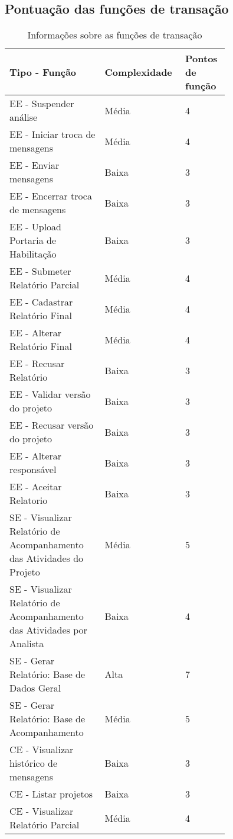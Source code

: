     
\vfill
\pagebreak
  \subsection{Pontuação das funções de transação}
    
	\begin{table*}[!h]
	\centering
	\caption{Informações sobre as funções de transação}
	\label{funcoes_transacao}
	  \begin{tabular}{|p{0.40\linewidth}|p{0.20\linewidth}|p{0.14\linewidth}|}
	\hline
	\textbf{Tipo - Função} & \textbf{Complexidade} & \textbf{Pontos de função} \\
	\hline
	  EE - Suspender análise & Média & 4 \\ \hline
	  EE - Iniciar troca de mensagens & Média & 4 \\ \hline
	  EE - Enviar mensagens & Baixa & 3\\ \hline
	  EE - Encerrar troca de mensagens & Baixa & 3 \\ \hline
	  EE - Upload Portaria de Habilitação &Baixa & 3\\ \hline
	  EE - Submeter Relatório Parcial & Média & 4 \\ \hline
	  EE - Cadastrar Relatório Final & Média & 4  \\ \hline
	  EE - Alterar Relatório Final & Média & 4  \\ \hline
	  EE - Recusar Relatório & Baixa & 3\\ \hline
	  EE - Validar versão do projeto & Baixa &3 \\ \hline
	  EE - Recusar versão do projeto & Baixa & 3\\ \hline
	  EE - Alterar responsável & Baixa & 3\\ \hline
	  EE - Aceitar Relatorio & Baixa&3 \\ \hline
	  SE - Visualizar Relatório de Acompanhamento das Atividades do Projeto & Média & 5 \\ \hline
	  SE - Visualizar Relatório de Acompanhamento das Atividades por Analista & Baixa & 4\\ \hline
	  SE - Gerar Relatório: Base de Dados Geral & Alta& 7\\ \hline
	  SE - Gerar Relatório: Base de Acompanhamento & Média & 5\\ \hline
	  CE - Visualizar histórico de mensagens & Baixa& 3\\ \hline
	  CE - Listar projetos & Baixa& 3\\ \hline
	  CE - Visualizar Relatório Parcial & Média& 4\\ \hline

\end{tabular}
\end{table*}
